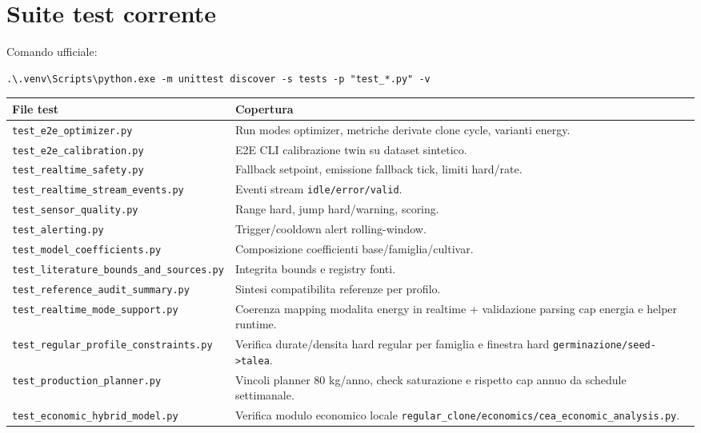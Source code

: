 ﻿\documentclass[11pt,a4paper]{report}
\begin{document}
\section{Suite test corrente}
Comando ufficiale:
\begin{lstlisting}
.\.venv\Scripts\python.exe -m unittest discover -s tests -p "test_*.py" -v
\end{lstlisting}

\begin{longtable}{@{}p{5.2cm}p{8.0cm}@{}}
\toprule
File test & Copertura \\ \midrule
\texttt{test\_e2e\_optimizer.py} & Run modes optimizer, metriche derivate clone cycle, varianti energy. \\
\texttt{test\_e2e\_calibration.py} & E2E CLI calibrazione twin su dataset sintetico. \\
\texttt{test\_realtime\_safety.py} & Fallback setpoint, emissione fallback tick, limiti hard/rate. \\
\texttt{test\_realtime\_stream\_events.py} & Eventi stream \texttt{idle/error/valid}. \\
\texttt{test\_sensor\_quality.py} & Range hard, jump hard/warning, scoring. \\
\texttt{test\_alerting.py} & Trigger/cooldown alert rolling-window. \\
\texttt{test\_model\_coefficients.py} & Composizione coefficienti base/famiglia/cultivar. \\
\texttt{test\_literature\_bounds\_and\_sources.py} & Integrita bounds e registry fonti. \\
\texttt{test\_reference\_audit\_summary.py} & Sintesi compatibilita referenze per profilo. \\
\texttt{test\_realtime\_mode\_support.py} & Coerenza mapping modalita energy in realtime + validazione parsing cap energia e helper runtime. \\
\texttt{test\_regular\_profile\_constraints.py} & Verifica durate/densita hard regular per famiglia e finestra hard \texttt{germinazione/seed->talea}. \\
\texttt{test\_production\_planner.py} & Vincoli planner 80 kg/anno, check saturazione e rispetto cap annuo da schedule settimanale. \\
\texttt{test\_economic\_hybrid\_model.py} & Verifica modulo economico locale \texttt{regular\_clone/economics/cea\_economic\_analysis.py}. \\
\bottomrule
\end{longtable}
\end{document}
